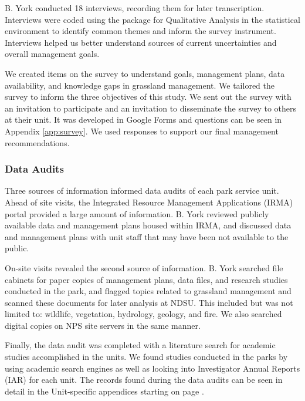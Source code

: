 B. York conducted 18 interviews, recording them for later transcription.
Interviews were coded using the  package for Qualitative Analysis in the \R statistical environment  \citep{rcoreteam2017,huang2018} to identify common themes and inform the survey instrument.
Interviews helped us better understand sources of current uncertainties and overall management goals.

We created items on the survey to understand goals, management plans, data availability, and knowledge gaps in grassland management. 
We tailored the survey to inform the three objectives of this study. 
We sent out the survey with an invitation to participate and an invitation to disseminate the survey to others at their unit. 
It was developed in Google Forms and questions can be seen in Appendix \ref{app:survey}. 
We used responses to support our final management recommendations.

\subsubsection{Data Audits} 
Three sources of information informed data audits of each park service unit. 
Ahead of site visits, the Integrated Resource Management Applications (IRMA) portal provided a large amount of information. 
B. York reviewed publicly available data and management plans housed within IRMA, and discussed data and management plans with unit staff that may have been not available to the public.

On-site visits revealed the second source of information. 
B. York searched file cabinets for paper copies of management plans, data files, and research studies conducted in the park, and flagged topics related to grassland management and scanned these documents for later analysis at NDSU. 
This included but was not limited to: wildlife, vegetation, hydrology, geology, and fire. 
We also searched digital copies on NPS site servers in the same manner. 

Finally, the data audit was completed with a literature search for academic studies accomplished in the units. 
We found studies conducted in the parks by using academic search engines as well as looking into Investigator Annual Reports (IAR) for each unit. 
The records found during the data audits can be seen in detail in the Unit-specific appendices starting on page \pageref{apps}.

